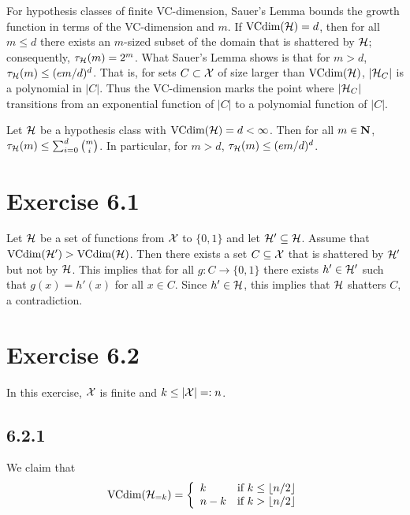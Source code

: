 For hypothesis classes of finite VC-dimension, Sauer's Lemma bounds the growth
function in terms of the VC-dimension and $m$. If $\text{VCdim}(\mathcal{H}) = d$, then for all
$m \leq d$ there exists an $m$-sized subset of the domain that is shattered by
$\mathcal{H}$; consequently, $\tau_{\mathcal{H}} (m) = 2^m$. What Sauer's Lemma shows
is that for $m > d$, $\tau_{\mathcal{H}} (m) \leq (em / d)^d$. That is, for sets
$C \subset \mathcal{X}$ of size larger than $\text{VCdim}(\mathcal{H})$, $|\mathcal{H}_{C}|$ is a
polynomial in $|C|$. Thus the VC-dimension marks the point where
$|\mathcal{H}_{C}|$ transitions from an exponential function of $|C|$ to a polynomial
function of $|C|$.
\begin{lemma}
Let $\mathcal{H}$ be a hypothesis class with $\text{VCdim}(\mathcal{H}) = d < \infty$.
Then for all $m \in \mathbf{N}$, $\tau_{\mathcal{H}}(m) \leq \sum_{i = 0}^{d} {m \choose i}$.
In particular, for $m > d$, $\tau_{\mathcal{H}}(m) \leq (e m / d)^d$.
\end{lemma}

\section*{Exercise 6.1}

Let $\mathcal{H}$ be a set of functions from $\mathcal{X}$ to $\{0, 1\}$ and
let $\mathcal{H}' \subseteq \mathcal{H}$. Assume that $\text{VCdim} (\mathcal{H}') > \text{VCdim}
(\mathcal{H})$.  Then there exists a set $C \subseteq \mathcal{X}$ that is shattered by
$\mathcal{H}'$ but not by $\mathcal{H}$.  This implies that for all $g \colon C
\rightarrow \{0, 1\}$ there exists $h' \in \mathcal{H}'$ such that $g(x) = h'(x)$
for all $x \in C$. Since $h' \in \mathcal{H}$, this implies that $\mathcal{H}$
shatters $C$, a contradiction.

\section*{Exercise 6.2}

In this exercise, $\mathcal{X}$ is finite and $k \leq |\mathcal{X}| =: n$.

\subsection*{6.2.1}

We claim that
\[\text{VCdim}(\mathcal{H}_{= k})
= \left \{ \begin{array}{ll}
                k     & \text{if } k \leq \left \lfloor n / 2 \right \rfloor \\
                n - k & \text{if } k > \left \lfloor n / 2 \right \rfloor
           \end{array} \right .
\]

